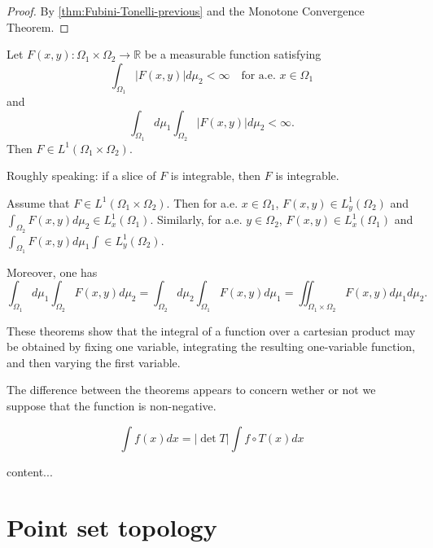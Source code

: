 \documentclass{article}
\theoremstyle{definition}
\numberwithin{equation}{section}
\newcommand{\R}{\mathbb{R}}
\begin{document}
	\begin{proof}
		By \cref{thm:Fubini-Tonelli-previous} and the Monotone Convergence Theorem.
	\end{proof}
	
	\begin{thm}
		Let $F(x,y):\Omega_1\times \Omega_2\to\R$ be a measurable function satisfying
	 	\[\int_{\Omega_1}|F(x,y)|d\mu_2<\infty\quad\text{for a.e. } x\in\Omega_1\]
		and
	 	\[\int_{\Omega_1}d\mu_1\int_{\Omega_2}|F(x,y)|d\mu_2<\infty.\]
		Then $F\in L^1(\Omega_1\times \Omega_2)$.
			
		{\color{persiangreen}Roughly speaking: if a slice of $F$ is integrable, then $F$ is integrable.}
	\end{thm}
	
	\begin{thm}
		Assume that $F\in L^1(\Omega_1\times\Omega_2)$. Then for a.e. $x\in\Omega_1$, $F(x,y)\in L^1_y(\Omega_2)$ and $\int_{\Omega_2}F(x,y)d\mu_2\in L^1_x(\Omega_1)$. Similarly, for a.e. $y\in\Omega_2$, $F(x,y)\in L^1_x(\Omega_1)$ and $\int_{\Omega_1}F(x,y)d\mu_1\int\in L^1_y(\Omega_2)$.
		
		Moreover, one has
		\[\int_{\Omega_1}d\mu_1\int_{\Omega_2}F(x,y)d\mu_2=\int_{\Omega_2}d\mu_2\int_{\Omega_1}F(x,y)d\mu_1=\iint_{\Omega_1\times\Omega_2}F(x,y)d\mu_1d\mu_2.\]
	\end{thm}
	
	\begin{remark}
		These theorems show that the integral of a function over a cartesian product may be obtained by fixing one variable, integrating the resulting one-variable function, and then varying the first variable.
	\end{remark}
	\begin{remark}
		The difference between the theorems appears to concern wether or not we suppose that the function is non-negative.
	\end{remark}

		\begin{thm}[2.44]
			\[\int f(x)dx=|\det T|\int f\circ T(x)dx\]
		\end{thm}
		\begin{thm}[2.47, diffeomorphisms]
			content...
		\end{thm}

\clearpage

\section{Point set topology}
\end{document}
